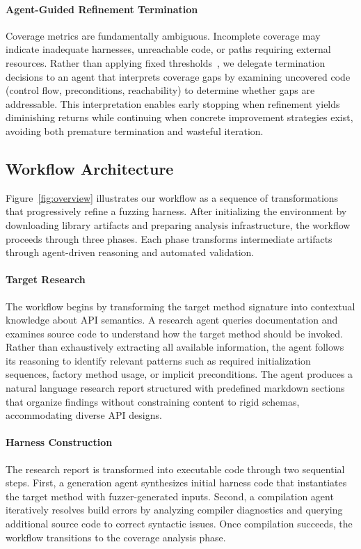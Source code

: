 \paragraph{Agent-Guided Refinement Termination}
Coverage metrics are fundamentally ambiguous. Incomplete coverage may indicate inadequate harnesses, unreachable code, or paths requiring external resources. Rather than applying fixed thresholds~\cite{CITE:coverage-threshold-approaches}, we delegate termination decisions to an agent that interprets coverage gaps by examining uncovered code (control flow, preconditions, reachability) to determine whether gaps are addressable. This interpretation enables early stopping when refinement yields diminishing returns while continuing when concrete improvement strategies exist, avoiding both premature termination and wasteful iteration.

\subsection{Workflow Architecture}%
\label{subsec:workflow-architecture}


Figure~\ref{fig:overview} illustrates our workflow as a sequence of transformations that progressively refine a fuzzing harness. After initializing the environment by downloading library artifacts and preparing analysis infrastructure, the workflow proceeds through three phases. Each phase transforms intermediate artifacts through agent-driven reasoning and automated validation.

\paragraph{Target Research}
The workflow begins by transforming the target method signature into contextual knowledge about API semantics. A research agent queries documentation and examines source code to understand how the target method should be invoked. Rather than exhaustively extracting all available information, the agent follows its reasoning to identify relevant patterns such as required initialization sequences, factory method usage, or implicit preconditions. The agent produces a natural language research report structured with predefined markdown sections that organize findings without constraining content to rigid schemas, accommodating diverse API designs.

\paragraph{Harness Construction}
The research report is transformed into executable code through two sequential steps. First, a generation agent synthesizes initial harness code that instantiates the target method with fuzzer-generated inputs. Second, a compilation agent iteratively resolves build errors by analyzing compiler diagnostics and querying additional source code to correct syntactic issues. Once compilation succeeds, the workflow transitions to the coverage analysis phase.

